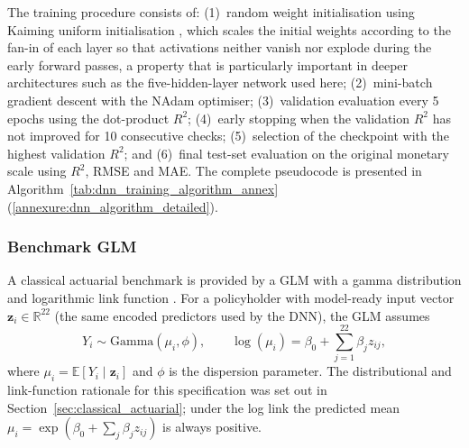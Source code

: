 The training procedure consists of: (1)~random weight initialisation
using Kaiming uniform initialisation \citep{he2015delving}, which
scales the initial weights according to the fan-in of each layer so
that activations neither vanish nor explode during the early forward
passes, a property that is particularly important in deeper
architectures such as the five-hidden-layer network used here;
(2)~mini-batch gradient descent with the NAdam optimiser;
(3)~validation evaluation every 5 epochs using the dot-product \ensuremath{R^2};
(4)~early stopping when the validation \ensuremath{R^2} has not improved for 10
consecutive checks; (5)~selection of the checkpoint with the highest
validation \ensuremath{R^2}; and (6)~final test-set evaluation on the original
monetary scale using \ensuremath{R^2}, RMSE and MAE.  The complete
pseudocode is presented in
Algorithm~\ref{tab:dnn_training_algorithm_annex}
(\ref{annexure:dnn_algorithm_detailed}).

\subsubsection{Benchmark GLM}
\label{sec:glm_benchmark_methods}

A classical actuarial benchmark is provided by a GLM
with a gamma distribution and logarithmic link function
\citep{dobson2008introduction, mccullagh1989generalized}.  For a policyholder with
model-ready input vector $\mathbf{z}_i \in \mathbb{R}^{22}$ (the same encoded
predictors used by the DNN), the GLM assumes
\begin{equation}
    Y_i \sim \text{Gamma}(\mu_i, \phi),
    \qquad
    \log(\mu_i) = \beta_0 + \sum_{j=1}^{22} \beta_j z_{ij},
    \label{eq:glm_specification}
\end{equation}
where $\mu_i = \mathbb{E}[Y_i \mid \mathbf{z}_i]$ and $\phi$ is the
dispersion parameter.  The distributional and link-function rationale
for this specification was set out in
Section~\ref{sec:classical_actuarial}; under the log link the predicted
mean $\mu_i = \exp(\beta_0 + \sum_j \beta_j z_{ij})$ is always positive.

